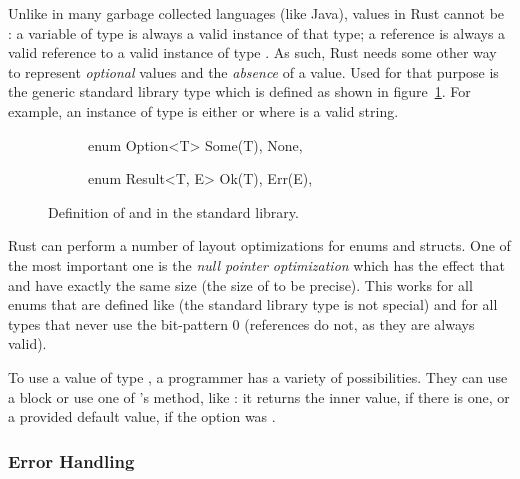 Unlike in many garbage collected languages (like Java), values in Rust cannot be :
a variable of type  is always a valid instance of that type; a reference  is always a valid reference to a valid instance of type .
As such, Rust needs some other way to represent \emph{optional} values and the \emph{absence} of a value.
Used for that purpose is the generic standard library type  which is defined as shown in figure~\ref{fig:option-result-def}.
For example, an instance of type  is either  or  where  is a valid string.

\begin{figure}[t]
\centering
\begin{subfigure}{.4\textwidth}
\begin{rustcode}
enum Option<T> {
    Some(T),
    None,
}
\end{rustcode}
\end{subfigure}
\begin{subfigure}{.4\textwidth}
\begin{rustcode}
enum Result<T, E> {
    Ok(T),
    Err(E),
}
\end{rustcode}
\end{subfigure}
\caption{Definition of  and  in the standard library.}
\label{fig:option-result-def}
\end{figure}

Rust can perform a number of layout optimizations for enums and structs. One of the most important one is the \emph{null pointer optimization} which has the effect that  and  have exactly the same size (the size of  to be precise). This works for all enums that are defined like  (the standard library type is not special) and for all types that never use the bit-pattern 0 (references do not, as they are always valid).

To use a value of type , a programmer has a variety of possibilities. They can use a  block or use one of 's method, like : it returns the inner value, if there is one, or a provided default value, if the option was .

\subsubsection*{Error Handling}

